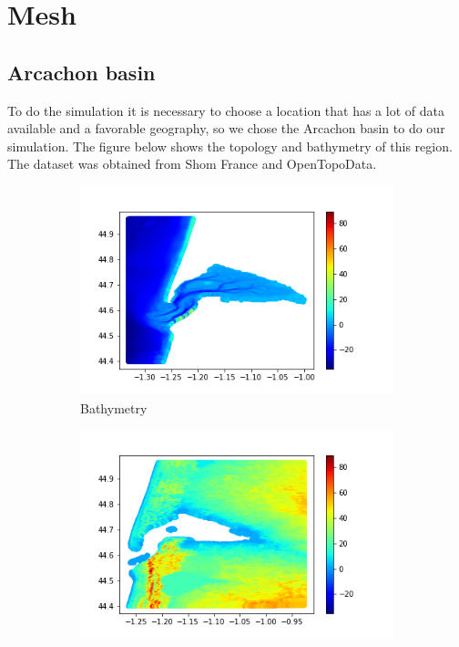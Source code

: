 \chapter{Mesh}
\label{chapter4}
\section{Arcachon basin}
To do the simulation it is necessary to choose a location that has a lot of data available and a favorable geography, so we chose the Arcachon basin to do our simulation. The figure below shows the topology and bathymetry of this region.
The dataset was obtained from Shom France and OpenTopoData.
\vspace*{-0.85cm}
\begin{figure}[h]
    \hspace*{-1.5cm}
    \begin{subfigure}{0.5\textwidth}
        \centering
        \includegraphics[scale=0.5]{images/Mesh/Mar_data.png}
        \caption{Bathymetry}
        \label{fig:sub1}
    \end{subfigure}%
    \hspace*{-2.7cm}
    \begin{subfigure}{0.5\textwidth}
        \centering
        \includegraphics[scale=0.5]{images/Mesh/Topo_data.png}

\end{subfigure}
\end{figure}
